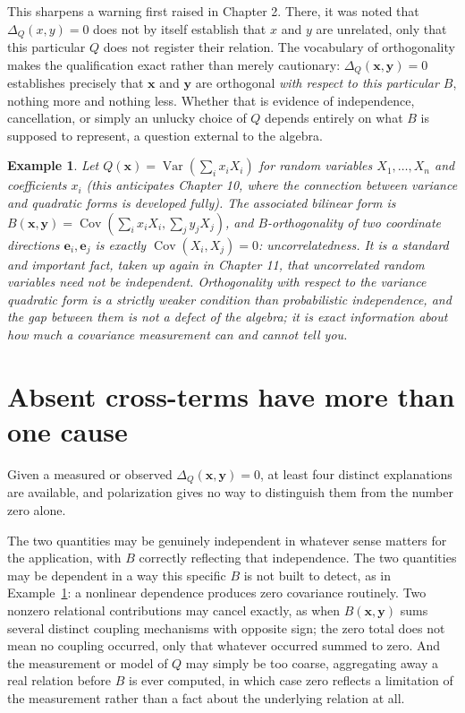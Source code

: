 \documentclass[11pt]{book}
\newtheorem{example}[theorem]{Example}
\begin{document}
This sharpens a warning first raised in Chapter 2. There, it was noted that $\Delta_Q(x,y)=0$ does not by itself establish that $x$ and $y$ are unrelated, only that this particular $Q$ does not register their relation. The vocabulary of orthogonality makes the qualification exact rather than merely cautionary: $\Delta_Q(\mathbf{x},\mathbf{y})=0$ establishes precisely that $\mathbf{x}$ and $\mathbf{y}$ are orthogonal \emph{with respect to this particular $B$}, nothing more and nothing less. Whether that is evidence of independence, cancellation, or simply an unlucky choice of $Q$ depends entirely on what $B$ is supposed to represent, a question external to the algebra.

\begin{example}
\label{ex:covariance-orthogonal}
Let $Q(\mathbf{x})=\operatorname{Var}\left(\sum_i x_iX_i\right)$ for random variables $X_1,\ldots,X_n$ and coefficients $x_i$ (this anticipates Chapter 10, where the connection between variance and quadratic forms is developed fully). The associated bilinear form is $B(\mathbf{x},\mathbf{y})=\operatorname{Cov}\left(\sum_ix_iX_i,\sum_jy_jX_j\right)$, and $B$-orthogonality of two coordinate directions $\mathbf{e}_i,\mathbf{e}_j$ is exactly $\operatorname{Cov}(X_i,X_j)=0$: uncorrelatedness. It is a standard and important fact, taken up again in Chapter 11, that uncorrelated random variables need not be independent. Orthogonality with respect to the variance quadratic form is a strictly weaker condition than probabilistic independence, and the gap between them is not a defect of the algebra; it is exact information about how much a covariance measurement can and cannot tell you.
\end{example}

\section{Absent cross-terms have more than one cause}

Given a measured or observed $\Delta_Q(\mathbf{x},\mathbf{y})=0$, at least four distinct explanations are available, and polarization gives no way to distinguish them from the number zero alone.

The two quantities may be genuinely independent in whatever sense matters for the application, with $B$ correctly reflecting that independence. The two quantities may be dependent in a way this specific $B$ is not built to detect, as in Example~\ref{ex:covariance-orthogonal}: a nonlinear dependence produces zero covariance routinely. Two nonzero relational contributions may cancel exactly, as when $B(\mathbf{x},\mathbf{y})$ sums several distinct coupling mechanisms with opposite sign; the zero total does not mean no coupling occurred, only that whatever occurred summed to zero. And the measurement or model of $Q$ may simply be too coarse, aggregating away a real relation before $B$ is ever computed, in which case zero reflects a limitation of the measurement rather than a fact about the underlying relation at all.
\end{document}
